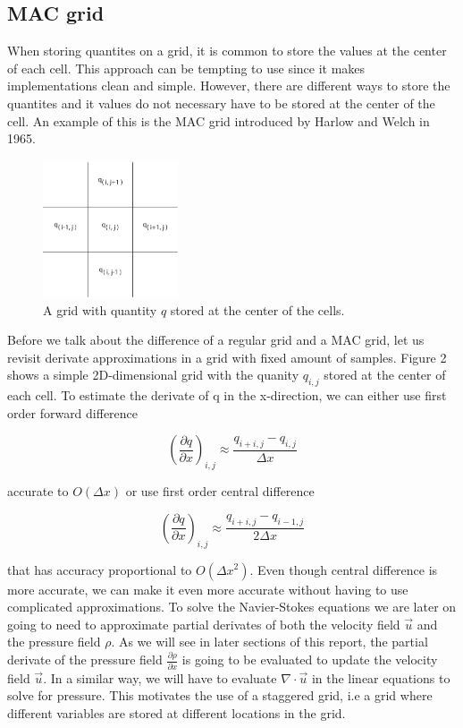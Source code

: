\subsection{MAC grid}

When storing quantites on a grid, it is common to store the values at the center of each cell. This approach can be tempting to use since it makes implementations clean and simple. However, there are different ways to store the quantites and it values do not necessary have to be stored at the center of the cell. An example of this is the MAC grid introduced by Harlow and Welch in 1965.

\begin{figure}[ht!]
\centering
\includegraphics[width=40mm]{img/mac.pdf}
\caption{A grid with quantity $q$ stored at the center of the cells.}
\label{regulargrid}
\end{figure}

Before we talk about the difference of a regular grid and a MAC grid, let us revisit derivate approximations in a grid with fixed amount of samples. Figure 2 shows a simple 2D-dimensional grid with the quanity $q_{i,j}$ stored at the center of each cell. To estimate the derivate of q in the x-direction, we can either use first order forward difference 

\begin{equation}
(\frac{\partial q}{\partial x})_{i,j} \approx \frac{q_{i+i,j} - q_{i,j}}{\Delta x}
\end{equation}

accurate to $O(\Delta x)$ or use first order central difference

\begin{equation}
(\frac{\partial q}{\partial x})_{i,j} \approx \frac{q_{i+i,j} - q_{i-1,j}}{2\Delta x}
\label{centraldifference}
\end{equation}

that has accuracy proportional to $O(\Delta x^{2})$. Even though central difference is more accurate, we can make it even more accurate without having to use complicated approximations. To solve the Navier-Stokes equations we are later on going to need to approximate partial derivates of both the velocity field $\vec{u}$ and the pressure field $\rho$. As we will see in later sections of this report, the partial derivate of the pressure field $\frac{\partial \rho}{\partial x}$ is going to be evaluated to update the velocity field $\vec{u}$. In a similar way, we will have to evaluate $\nabla \cdot \vec{u}$ in the linear equations to solve for pressure. This motivates the use of a staggered grid, i.e a grid where different variables are stored at different locations in the grid.

